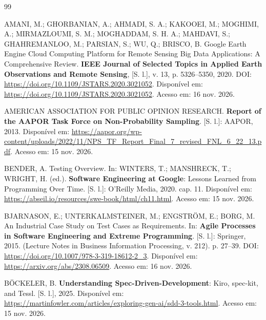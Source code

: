 
\begin{thebibliography}{99}

\MakeUppercase{Amani}, M.; \MakeUppercase{Ghorbanian}, A.; \MakeUppercase{Ahmadi}, S. A.; \MakeUppercase{Kakooei}, M.; \MakeUppercase{Moghimi}, A.; \MakeUppercase{Mirmazloumi}, S. M.; \MakeUppercase{Moghaddam}, S. H. A.; \MakeUppercase{Mahdavi}, S.; \MakeUppercase{Ghahremanloo}, M.; \MakeUppercase{Parsian}, S.; \MakeUppercase{Wu}, Q.; \MakeUppercase{Brisco}, B.
{Google Earth Engine} Cloud Computing Platform for Remote Sensing Big Data Applications: A Comprehensive Review.
\textbf{IEEE Journal of Selected Topics in Applied Earth Observations and Remote Sensing}, [S. l.],
v. 13,
p. 5326--5350,
2020.
DOI: \url{https://doi.org/10.1109/JSTARS.2020.3021052}.
Disponível em: \url{https://doi.org/10.1109/JSTARS.2020.3021052}.
Acesso em: 16 nov. 2026.

\MakeUppercase{{American Association for Public Opinion Research}}.
\textbf{Report of the AAPOR Task Force on Non-Probability Sampling}.
[S. l.]: AAPOR, 2013.
Disponível em: \url{https://aapor.org/wp-content/uploads/2022/11/NPS_TF_Report_Final_7_revised_FNL_6_22_13.pdf}.
Acesso em: 15 nov. 2026.

\MakeUppercase{Bender}, A.
Testing Overview.
In:
\MakeUppercase{Winters}, T.; \MakeUppercase{Manshreck}, T.; \MakeUppercase{Wright}, H. (ed.).
\textbf{Software Engineering at Google}: Lessons Learned from Programming Over Time.
[S. l.]: O'Reilly Media, 2020.
cap. 11.
Disponível em: \url{https://abseil.io/resources/swe-book/html/ch11.html}.
Acesso em: 15 nov. 2026.

\MakeUppercase{Bjarnason}, E.; \MakeUppercase{Unterkalmsteiner}, M.; \MakeUppercase{Engstr{\"o}m}, E.; \MakeUppercase{Borg}, M.
An Industrial Case Study on Test Cases as Requirements.
In:
\textbf{Agile Processes in Software Engineering and Extreme Programming}.
[S. l.]: Springer, 2015.
(Lecture Notes in Business Information Processing, v. 212).
p. 27--39.
DOI: \url{https://doi.org/10.1007/978-3-319-18612-2_3}.
Disponível em: \url{https://arxiv.org/abs/2308.06509}.
Acesso em: 16 nov. 2026.

\MakeUppercase{Böckeler}, B.
\textbf{Understanding Spec-Driven-Development}: Kiro, spec-kit, and Tessl.
[S. l.], 2025.
Disponível em: \url{https://martinfowler.com/articles/exploring-gen-ai/sdd-3-tools.html}.
Acesso em: 15 nov. 2026.


\end{thebibliography}
